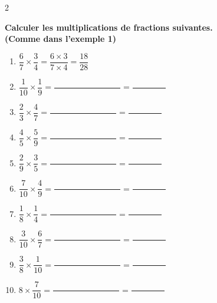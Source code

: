 \documentclass[10pt]{article}
\begin{document}
\begin{multicols}{2}
  \begin{exercicedevoir}[5]
    \textbf{Calculer les multiplications de fractions suivantes.  \\(Comme dans l'exemple
    1)}
    \begin{enumerate}
    \item $\dfrac{6}{7}\times\dfrac{3}{4} =\dfrac{6\times3}{7\times4}=\dfrac{18}{28} $  
    \item $\dfrac{1}{10}\times\dfrac{1}{9} = \dfrac{\phantom{0000000000000000}}{\phantom{0000000000000000}} = \dfrac{\phantom{00000000}}{\phantom{00000000}}$
	\item $\dfrac{2}{3}\times\dfrac{4}{7}  = \dfrac{\phantom{0000000000000000}}{\phantom{0000000000000000}} = \dfrac{\phantom{00000000}}{\phantom{00000000}}$
	\item $\dfrac{4}{5}\times\dfrac{5}{9} = \dfrac{\phantom{0000000000000000}}{\phantom{0000000000000000}} = \dfrac{\phantom{00000000}}{\phantom{00000000}}$
	\item $\dfrac{2}{9}\times\dfrac{3}{5} = \dfrac{\phantom{0000000000000000}}{\phantom{0000000000000000}} = \dfrac{\phantom{00000000}}{\phantom{00000000}}$
	\item $\dfrac{7}{10}\times\dfrac{4}{9} = \dfrac{\phantom{0000000000000000}}{\phantom{0000000000000000}} = \dfrac{\phantom{00000000}}{\phantom{00000000}}$
	\item $\dfrac{1}{8}\times\dfrac{1}{4} = \dfrac{\phantom{0000000000000000}}{\phantom{0000000000000000}} = \dfrac{\phantom{00000000}}{\phantom{00000000}}$
	\item $\dfrac{3}{10}\times\dfrac{6}{7} = \dfrac{\phantom{0000000000000000}}{\phantom{0000000000000000}} = \dfrac{\phantom{00000000}}{\phantom{00000000}}$
	\item $\dfrac{3}{8}\times\dfrac{1}{10} = \dfrac{\phantom{0000000000000000}}{\phantom{0000000000000000}} = \dfrac{\phantom{00000000}}{\phantom{00000000}}$
	\item $8\times\dfrac{7}{10} = \dfrac{\phantom{0000000000000000}}{\phantom{0000000000000000}} = \dfrac{\phantom{00000000}}{\phantom{00000000}}$
    \end{enumerate}
  \end{exercicedevoir}
\end{multicols}
\end{document}
